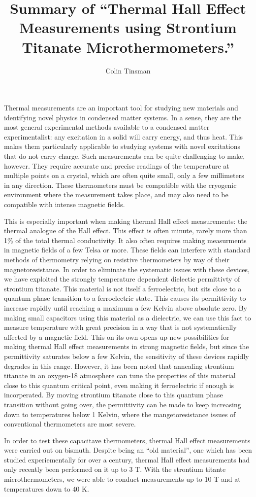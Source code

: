 \documentclass{article}
\title{Summary of ``Thermal Hall Effect Measurements using Strontium Titanate Microthermometers.''}
\author{Colin Tinsman}
\date{}
\begin{document}
\doublespacing
\maketitle
Thermal measurements are an important tool for studying new materials and identifying novel physics in condensed matter systems. In a sense, they are the most general experimental methods available to a condensed matter experimentalist: any excitation in a solid will carry energy, and thus heat. This makes them particularly applicable to studying systems with novel excitations that do not carry charge. Such measurements can be quite challenging to make, however. They require accurate and precise readings of the temperature at multiple points on a crystal, which are often quite small, only a few millimeters in any direction. These thermometers must be compatible with the cryogenic environment where the measurement takes place, and may also need to be compatible with intense magnetic fields.

This is especially important when making thermal Hall effect measurements: the thermal analogue of the Hall effect. This effect is often minute, rarely more than 1\% of the total thermal conductivity. It also often requires making measurments in magnetic fields of a few Telsa or more. These fields can interfere with standard methods of thermometry relying on resistive thermometers by way of their magnetoresistance. In order to eliminate the systematic issues with these devices, we have exploited the strongly temperature dependent dielectic permittivty of strontium titanate. This material is not itself a ferroelectric, but sits close to a quantum phase transition to a ferroelectric state. This causes its permittivity to increase rapidly until reaching a maximum a few Kelvin above absolute zero. By making small capacitors using this material as a dielectric, we can use this fact to measure temperature with great precision in a way that is not systematically affected by a magnetic field. This on its own opens up new possibilities for making thermal Hall effect measurements in strong magnetic fields, but since the permittivity saturates below a few Kelvin, the sensitivity of these devices rapidly degrades in this range. However, it has been noted that annealing strontium titanate in an oxygen-18 atmosphere can tune the properties of this material close to this quantum critical point, even making it ferroelectric if enough is incorperated. By moving strontium titanate close to this quantum phase transition without going over, the permittivity can be made to keep increasing down to temperatures below 1 Kelvin, where the mangetoresistance issues of conventional thermometers are most severe. 

In order to test these capacitave thermometers, thermal Hall effect measurements were carried out on bismuth. Despite being an ``old material'', one which has been studied experiementally for over a century, thermal Hall effect measurements had only recently been performed on it up to 3 T. With the strontium titante microthermometers, we were able to conduct measurements up to 10 T and at temperatures down to 40 K. 
\end{document}
